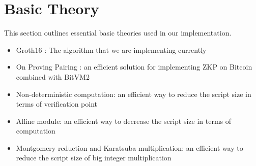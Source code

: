 \section{Basic Theory} \label{sec:basic-theory}
This section outlines essential basic theories used in our implementation.

\begin{itemize}
    \item Groth16 \cite{website:Groth16}: The algorithm that we are implementing currently
    \item On Proving Pairing \cite{website:On-proving-pairing}: an efficient solution for implementing ZKP on Bitcoin combined with BitVM2 \cite{website:BitVM2}
    \item Non-deterministic computation: an efficient way to reduce the script size in terms of verification point
    \item Affine module: an efficient way to decrease the script size in terms of computation
    \item Montgomery reduction and Karatsuba multiplication: an efficient way to reduce the script size of big integer multiplication
\end{itemize}






